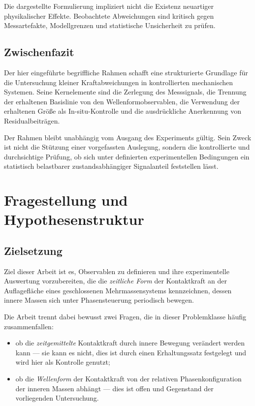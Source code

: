 \documentclass[12pt,a4paper]{report}
\begin{document}
Die dargestellte Formulierung impliziert nicht die Existenz neuartiger
physikalischer Effekte. Beobachtete Abweichungen sind kritisch gegen
Messartefakte, Modellgrenzen und statistische Unsicherheit zu prüfen.

\section{Zwischenfazit}

Der hier eingeführte begriffliche Rahmen schafft eine strukturierte
Grundlage für die Untersuchung kleiner Kraftabweichungen in
kontrollierten mechanischen Systemen. Seine Kernelemente sind die
Zerlegung des Messsignals, die Trennung der erhaltenen Basislinie von den
Wellenformobservablen, die Verwendung der erhaltenen Größe als
In-situ-Kontrolle und die ausdrückliche Anerkennung von
Residualbeiträgen.

Der Rahmen bleibt unabhängig vom Ausgang des Experiments gültig. Sein
Zweck ist nicht die Stützung einer vorgefassten Auslegung, sondern die
kontrollierte und durchsichtige Prüfung, ob sich unter definierten
experimentellen Bedingungen ein statistisch belastbarer
zustandsabhängiger Signalanteil feststellen lässt.


\chapter{Fragestellung und Hypothesenstruktur}
\label{chap:frage}

\section{Zielsetzung}

Ziel dieser Arbeit ist es, Observablen zu definieren und ihre
experimentelle Auswertung vorzubereiten, die die \emph{zeitliche Form}
der Kontaktkraft an der Auflagefläche eines geschlossenen
Mehrmassensystems kennzeichnen, dessen innere Massen sich unter
Phasensteuerung periodisch bewegen.

Die Arbeit trennt dabei bewusst zwei Fragen, die in dieser Problemklasse
häufig zusammenfallen:

\begin{itemize}
  \item ob die \emph{zeitgemittelte} Kontaktkraft durch innere Bewegung
        verändert werden kann --- sie kann es nicht, dies ist durch einen
        Erhaltungssatz festgelegt und wird hier als Kontrolle genutzt;
  \item ob die \emph{Wellenform} der Kontaktkraft von der relativen
        Phasenkonfiguration der inneren Massen abhängt --- dies ist offen
        und Gegenstand der vorliegenden Untersuchung.
\end{itemize}
\end{document}
